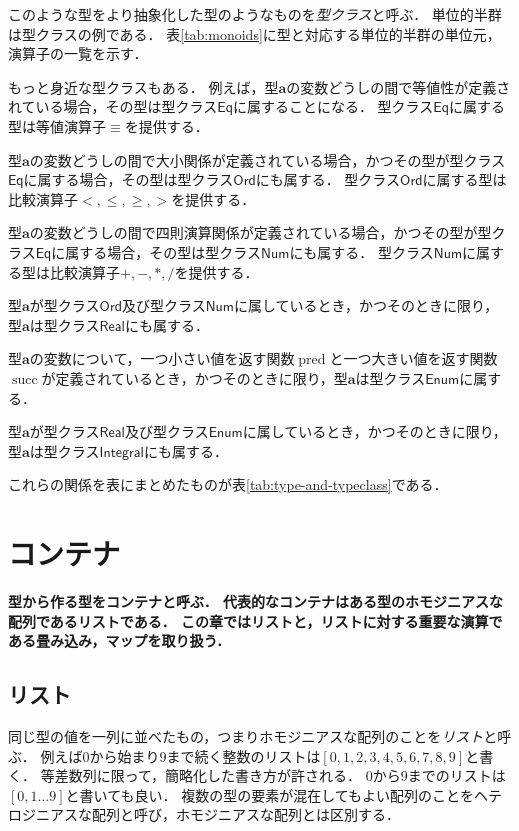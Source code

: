 \documentclass[twocolumn]{jsbook}
\newcommand{\hsklType}[1]{\textbf{#1}}
\newcommand{\hsklTypeclass}[1]{\mathsf{#1}}
\DeclareMathOperator{\hsklPred}{pred}
\DeclareMathOperator{\hsklSucc}{succ}
\newcommand{\hsklEnum}{\hsklTypeclass{Enum}}
\newcommand{\hsklIntegral}{\hsklTypeclass{Integral}}
\newcommand{\hsklEq}{\hsklTypeclass{Eq}}
\newcommand{\hsklNum}{\hsklTypeclass{Num}}
\newcommand{\hsklOrd}{\hsklTypeclass{Ord}}
\newcommand{\hsklReal}{\hsklTypeclass{Real}}
\newcommand{\keyword}[1]{\emph{#1}}
\newenvironment{leader}{\begingroup\bf}{\endgroup}
\begin{document}
このような型をより抽象化した型のようなものを\keyword{型クラス}と呼ぶ．
単位的半群は型クラスの例である．
表\ref{tab:monoids}に型と対応する単位的半群の単位元，演算子の一覧を示す．

もっと身近な型クラスもある．
例えば，型$\hsklType{a}$の変数どうしの間で等値性が定義されている場合，その型は型クラス$\hsklEq$に属することになる．
型クラス$\hsklEq$に属する型は等値演算子$\equiv$を提供する．

型$\hsklType{a}$の変数どうしの間で大小関係が定義されている場合，かつその型が型クラス$\hsklEq$に属する場合，その型は型クラス$\hsklOrd$にも属する．
型クラス$\hsklOrd$に属する型は比較演算子$<,\le,\ge,>$を提供する．

型$\hsklType{a}$の変数どうしの間で四則演算関係が定義されている場合，かつその型が型クラス$\hsklEq$に属する場合，その型は型クラス$\hsklNum$にも属する．
型クラス$\hsklNum$に属する型は比較演算子$+,-,*,/$を提供する．

型$\hsklType{a}$が型クラス$\hsklOrd$及び型クラス$\hsklNum$に属しているとき，かつそのときに限り，型$\hsklType{a}$は型クラス$\hsklReal$にも属する．

型$\hsklType{a}$の変数について，一つ小さい値を返す関数$\hsklPred$と一つ大きい値を返す関数$\hsklSucc$が定義されているとき，かつそのときに限り，型$\hsklType{a}$は型クラス$\hsklEnum$に属する．

型$\hsklType{a}$が型クラス$\hsklReal$及び型クラス$\hsklEnum$に属しているとき，かつそのときに限り，型$\hsklType{a}$は型クラス$\hsklIntegral$にも属する．

これらの関係を表にまとめたものが表\ref{tab:type-and-typeclass}である．

\chapter{コンテナ}

\begin{leader}
型から作る型をコンテナと呼ぶ．
代表的なコンテナはある型のホモジニアスな配列であるリストである．
この章ではリストと，リストに対する重要な演算である畳み込み，マップを取り扱う．
\end{leader}

\section{リスト}

同じ型の値を一列に並べたもの，つまりホモジニアスな配列のことを\keyword{リスト}と呼ぶ．
例えば$0$から始まり$9$まで続く整数のリストは$[0,1,2,3,4,5,6,7,8,9]$と書く．
等差数列に限って，簡略化した書き方が許される．
$0$から$9$までのリストは$[0,1\dots9]$と書いても良い．
複数の型の要素が混在してもよい配列のことをヘテロジニアスな配列と呼び，ホモジニアスな配列とは区別する．
\end{document}
